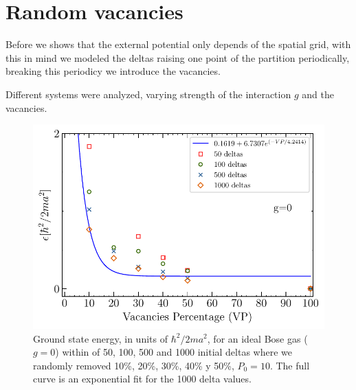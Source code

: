 \documentclass[twocolumn,showpacs,showkeys,preprintnumbers,superscriptaddress, pra, 10pt, aps]{revtex4-2}
\begin{document}
\section{Random vacancies}

Before we shows that the external potential only depends of the spatial grid, with this in mind we modeled the deltas raising one point of the partition periodically, breaking this periodicy we introduce the vacancies.

Different systems were analyzed, varying strength of the interaction $g$ and the vacancies. %

\begin{figure}[H]
  \centering
  \includegraphics[width=\linewidth]{g0.pdf}
  \caption{Ground state energy, in units of $\hbar^2/2ma^2$, for an ideal Bose gas ($g=0$) within of 50, 100, 500
    and 1000 initial deltas where we randomly removed 10\%, 20\%, 30\%, 40\% y 50\%, $P_0=10$. The full curve is an exponential fit for the 1000 delta values.}%
  \label{fig:Energiasg0}
\end{figure}
\end{document}
